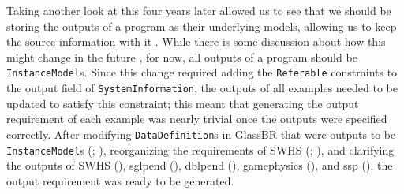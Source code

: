 Taking another look at this four years later allowed us to
see that we should be storing the outputs of a program as their underlying
models, allowing us to keep the source information with it
. While there is some discussion about how this might
change in the future , for now, all outputs of a program should be
\texttt{InstanceModel}s. Since this change required adding the
\texttt{Referable}  constraints to the output field of
\texttt{SystemInformation}, the outputs of all examples needed to be updated to
satisfy this constraint; this meant that generating the output requirement of
each example was nearly trivial once the outputs were specified correctly.
After modifying \texttt{DataDefinition}s in GlassBR that were outputs to be
\texttt{InstanceModel}s (; ), reorganizing the
requirements of SWHS (; ), and clarifying the
outputs of SWHS (), \acs{sglpend} (),
\acs{dblpend} (), \acs{gamephysics} (), and
\acs{ssp} (), the output requirement was ready to be generated.
